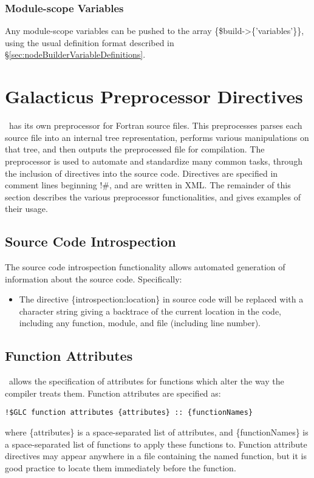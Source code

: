 \subsubsection{Module-scope Variables}

Any module-scope variables can be pushed to the array {\normalfont \ttfamily \@\{\$build->\{'variables'\}\}}, using the usual definition format described in \S\ref{sec:nodeBuilderVariableDefinitions}.

\section{Galacticus Preprocessor Directives}

\glc\ has its own preprocessor for Fortran source files. This preprocesses parses each source file into an internal tree representation, performs various manipulations on that tree, and then outputs the preprocessed file for compilation. The preprocessor is used to automate and standardize many common tasks, through the inclusion of directives into the source code. Directives are specified in comment lines beginning {\normalfont \ttfamily !\#}, and are written in XML. The remainder of this section describes the various preprocessor functionalities, and gives examples of their usage.

\subsection{Source Code Introspection}

The source code introspection functionality allows automated generation of information about the source code. Specifically:
\begin{itemize}
\item The directive {\normalfont \ttfamily \{introspection:location\}} in source code will be replaced with a character string giving a backtrace of the current location in the code, including any function, module, and file (including line number).
\end{itemize}

\subsection{Function Attributes}

\glc\ allows the specification of attributes for functions which alter the way the compiler treats them. Function attributes are specified as:
\begin{verbatim}
!$GLC function attributes {attributes} :: {functionNames}
\end{verbatim}
where {\normalfont \ttfamily \{attributes\}} is a space-separated list of attributes, and {\normalfont \ttfamily \{functionNames\}} is a space-separated list of functions to apply these functions to. Function attribute directives may appear anywhere in a file containing the named function, but it is good practice to locate them immediately before the function.

